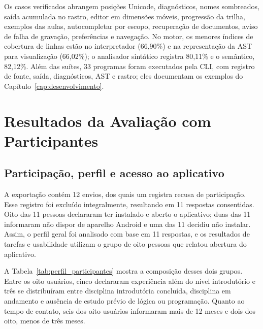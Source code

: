 \documentclass[
    12pt
    ,oneside
    ,a4paper
    ,chapter=TITLE
    ,section=TITLE
    ,sumario=abnt-6027-2012]{abntex2}
\begin{document}
Os casos verificados abrangem posições Unicode, diagnósticos, nomes sombreados, saída
acumulada no rastro, editor em dimensões móveis, progressão da trilha, exemplos das aulas,
autocompletar por escopo, recuperação de documentos, aviso de falha de gravação,
preferências e navegação. No motor, os menores índices de cobertura de linhas estão no
interpretador (66,90\%) e na representação da AST para visualização (66,02\%); o
analisador sintático registra 80,11\% e o semântico, 82,12\%. Além das suítes, 33
programas foram executados pela CLI, com registro de fonte, saída, diagnósticos, AST e
rastro; eles documentam os exemplos do Capítulo~\ref{cap:desenvolvimento}.



\section{Resultados da Avaliação com Participantes}
\label{sec:resultados_usuarios}

\subsection{Participação, perfil e acesso ao aplicativo}

A exportação contém 12 envios, dos quais um registra recusa de participação. Esse registro
foi excluído integralmente, resultando em 11 respostas consentidas. Oito das 11 pessoas declararam ter instalado e aberto o aplicativo; duas das 11
informaram não dispor de aparelho Android e uma das 11 decidiu não instalar. Assim, o perfil geral foi
analisado com base em 11 respostas, e os resultados de tarefas e usabilidade utilizam
o grupo de oito pessoas que relatou abertura do aplicativo.

A Tabela~\ref{tab:perfil_participantes} mostra a composição desses dois grupos.
Entre os oito usuários, cinco declararam experiência além do nível introdutório e três
se distribuíram entre disciplina introdutória concluída, disciplina em andamento e
ausência de estudo prévio de lógica ou programação. Quanto ao tempo de contato, seis
dos oito usuários informaram mais de 12 meses e dois dos oito, menos de três meses.
\end{document}
